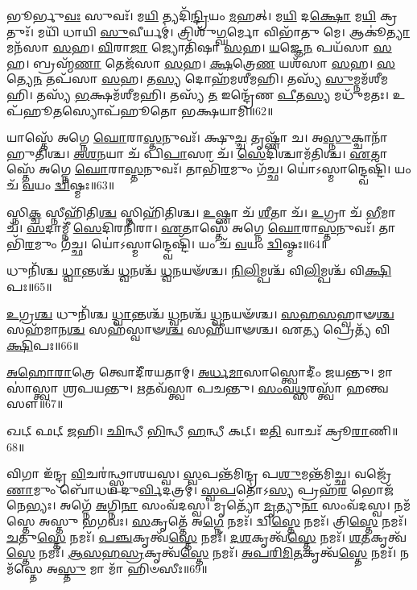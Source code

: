 𑌭𑍂𑌰𑍍𑌭𑍁\-\ul{𑌵𑌃} 𑌸𑍁𑌵𑌃᳴। 
𑌮\-\ul{𑌯𑌿} 𑌤𑍍𑌯𑌦𑌿᳴\-\ul{𑌨𑍍𑌦𑍍𑌰𑌿}\-𑌯𑌂 \ul{𑌮}\-𑌹𑌤𑍍। 
𑌮\-\ul{𑌯𑌿} 𑌦\-\ul{𑌕𑍍𑌷𑍋} 𑌮\-\ul{𑌯𑌿} 𑌕𑍍𑌰𑌤𑍁𑌃᳴। 
𑌮𑌯𑌿᳴ 𑌧𑌾𑌯𑌿 \ul{𑌸𑍁}\-𑌵𑍀𑌰𑍍𑌯𑌮𑍍॑। 
𑌤𑍍𑌰𑌿𑌶𑍁᳴\-\ul{𑌗𑍍𑌘}\-𑌰𑍍𑌮𑍋 𑌵𑌿𑌭𑌾᳴𑌤𑍁 𑌮𑍇। 
𑌆𑌕𑍂॑\-\ul{𑌤𑍍𑌯𑌾} 𑌮𑌨᳴𑌸𑌾 \ul{𑌸}\-𑌹। 
\-\ul{𑌵𑌿}\-𑌰𑌾\-\ul{𑌜𑌾} 𑌜𑍍𑌯𑍋𑌤𑌿᳴𑌷𑌾 \ul{𑌸}\-𑌹। 
\-\ul{𑌯}\-𑌜𑍍𑌞𑍇\-\ul{𑌨} 𑌪𑌯᳴𑌸𑌾 \ul{𑌸}\-𑌹। 
𑌬𑍍𑌰𑌹𑍍𑌮᳴\-\ul{𑌣𑌾} 𑌤𑍇𑌜᳴𑌸𑌾 \ul{𑌸}\-𑌹। 
\-\ul{𑌕𑍍𑌷}\-𑌤𑍍𑌰𑍇\-\ul{𑌣} 𑌯𑌶᳴𑌸𑌾 \ul{𑌸}\-𑌹। 
\-\ul{𑌸}\-𑌤𑍍𑌯𑍇\-\ul{𑌨} 𑌤𑌪᳴𑌸𑌾 \ul{𑌸}\-𑌹। 
𑌤\-\ul{𑌸𑍍𑌯} 𑌦𑍋𑌹᳴𑌮𑌶𑍀𑌮𑌹𑌿। 
𑌤𑌸𑍍𑌯᳴ \ul{𑌸𑍁}\-𑌮𑍍𑌨𑌮᳴𑌶𑍀𑌮𑌹𑌿। 
𑌤𑌸𑍍𑌯᳴ \ul{𑌭}\-𑌕𑍍𑌷𑌮᳴𑌶𑍀𑌮𑌹𑌿। 
𑌤𑌸𑍍𑌯᳴ \ul{𑌤} 𑌇𑌨𑍍𑌦𑍍𑌰𑍇᳴𑌣 \ul{𑌪𑍀}\-𑌤\-\ul{𑌸𑍍𑌯} 𑌮𑌧𑍁᳴𑌮𑌤𑌃। 
𑌉𑌪᳴𑌹𑍂\-\ul{𑌤}\-𑌸𑍍𑌯𑍋𑌪᳴𑌹𑍂𑌤𑍋 𑌭𑌕𑍍𑌷𑌯𑌾𑌮𑌿॥62॥
\anuvakamend[𑌯𑌶᳴𑌸𑌾 \ul{𑌸}\-𑌹 𑌷𑌟𑍍𑌚᳴]

𑌯𑌾𑌸𑍍𑌤𑍇᳴ 𑌅𑌗𑍍𑌨𑍇 \ul{𑌘𑍋}\-𑌰𑌾\-\ul{𑌸𑍍𑌤}\-𑌨𑍁𑌵𑌃᳴। 
𑌕𑍍𑌷𑍁\-\ul{𑌚𑍍𑌚} 𑌤𑍃𑌷𑍍𑌣𑌾᳴ 𑌚। 
𑌅\-\ul{𑌸𑍍𑌨𑍁}\-𑌕𑍍𑌚𑌾𑌨𑌾᳴𑌹𑍁𑌤𑌿𑌶𑍍𑌚। 
\-\ul{𑌅}\-\-\ul{𑌶}\-\-\ul{𑌨}\-𑌯𑌾 𑌚᳴ 𑌪𑌿\-\ul{𑌪𑌾}\-𑌸𑌾 𑌚᳴। 
\-\ul{𑌸𑍇}\-𑌦𑌿𑌶𑍍𑌚𑌾𑌮᳴𑌤𑌿𑌶𑍍𑌚। 
\-\ul{𑌏}\-𑌤𑌾𑌸𑍍𑌤𑍇᳴ 𑌅𑌗𑍍𑌨𑍇 \ul{𑌘𑍋}\-𑌰𑌾\-\ul{𑌸𑍍𑌤}\-𑌨𑍁𑌵𑌃᳴। 
𑌤𑌾𑌭𑌿᳴\-\ul{𑌰}\-𑌮𑍁𑌂 𑌗᳴𑌚𑍍𑌛। 
𑌯𑍋॑𑌽𑌸𑍍𑌮𑌾𑌨𑍍𑌦𑍍𑌵𑍇𑌷𑍍𑌟𑌿᳴। 
𑌯𑌂 𑌚᳴ \ul{𑌵}\-𑌯𑌂 \ul{𑌦𑍍𑌵𑌿}\-𑌷𑍍𑌮𑌃॥63॥
\anuvakamend

𑌸𑍍𑌨𑌿\-\ul{𑌕𑍍𑌚} 𑌸𑍍𑌨𑍀𑌹𑌿᳴𑌤𑌿\-\ul{𑌶𑍍𑌚} 𑌸𑍍𑌨𑌿𑌹𑌿᳴𑌤𑌿𑌶𑍍𑌚। 
\-\ul{𑌉}\-𑌷𑍍𑌣𑌾 𑌚᳴ \ul{𑌶𑍀}\-𑌤𑌾 𑌚᳴। 
\-\ul{𑌉}\-𑌗𑍍𑌰𑌾 𑌚᳴ \ul{𑌭𑍀}\-𑌮𑌾 𑌚᳴। 
\-\ul{𑌸}\-𑌦𑌾𑌮𑍍𑌨𑍀᳴ \ul{𑌸𑍇}\-𑌦𑌿𑌰𑌨𑌿᳴𑌰𑌾। 
\-\ul{𑌏}\-𑌤𑌾𑌸𑍍𑌤𑍇᳴ 𑌅𑌗𑍍𑌨𑍇 \ul{𑌘𑍋}\-𑌰𑌾\-\ul{𑌸𑍍𑌤}\-𑌨𑍁𑌵𑌃᳴। 
𑌤𑌾𑌭𑌿᳴\-\ul{𑌰}\-𑌮𑍁𑌂 𑌗᳴𑌚𑍍𑌛। 
𑌯𑍋॑𑌽𑌸𑍍𑌮𑌾𑌨𑍍𑌦𑍍𑌵𑍇𑌷𑍍𑌟𑌿᳴। 
𑌯𑌂 𑌚᳴ \ul{𑌵}\-𑌯𑌂 \ul{𑌦𑍍𑌵𑌿}\-𑌷𑍍𑌮𑌃॥64॥
\anuvakamend

𑌧𑍁𑌨𑌿᳴𑌶𑍍𑌚 \ul{𑌧𑍍𑌵𑌾}\-𑌨𑍍𑌤𑌶𑍍𑌚᳴ \ul{𑌧𑍍𑌵}\-𑌨𑌶𑍍𑌚᳴ \ul{𑌧𑍍𑌵}\-𑌨𑌯𑍟᳴𑌶𑍍𑌚। 
\-\ul{𑌨𑌿}\-\-\ul{𑌲𑌿}\-𑌮𑍍𑌪𑌶𑍍𑌚᳴ 𑌵𑌿\-\ul{𑌲𑌿}\-𑌮𑍍𑌪𑌶𑍍𑌚᳴ 𑌵𑌿\-\ul{𑌕𑍍𑌷𑌿}\-𑌪𑌃॥65॥
\anuvakamend

\-\ul{𑌉}\-𑌗𑍍𑌰\-\ul{𑌶𑍍𑌚} 𑌧𑍁𑌨𑌿᳴𑌶𑍍𑌚 \ul{𑌧𑍍𑌵𑌾}\-𑌨𑍍𑌤𑌶𑍍𑌚᳴ \ul{𑌧𑍍𑌵}\-𑌨𑌶𑍍𑌚᳴ \ul{𑌧𑍍𑌵}\-𑌨𑌯𑍟᳴𑌶𑍍𑌚। 
\-\ul{𑌸}\-\-\ul{𑌹}\-\-\ul{𑌸}\-𑌹𑍍𑌵𑌾𑍟\-\ul{𑌶𑍍𑌚} 𑌸𑌹᳴𑌮𑌾𑌨\-\ul{𑌶𑍍𑌚} 𑌸𑌹᳴𑌸𑍍𑌵𑌾𑍟\-\ul{𑌶𑍍𑌚} 𑌸𑌹𑍀᳴𑌯𑌾𑍟𑌶𑍍𑌚। 
𑌏\-\ul{𑌤𑍍𑌯} 𑌪𑍍𑌰𑍇𑌤𑍍𑌯᳴ 𑌵𑌿\-\ul{𑌕𑍍𑌷𑌿}\-𑌪𑌃॥66॥
\anuvakamend


\-\ul{𑌅}\-\-\ul{𑌹𑍋}\-\-\ul{𑌰𑌾}\-𑌤𑍍𑌰𑍇 𑌤𑍍𑌵𑍋𑌦𑍀᳴𑌰𑌯𑌤𑌾𑌮𑍍। 
\-\ul{𑌅}\-\-\ul{𑌰𑍍𑌧}\-\-\ul{𑌮𑌾}\-𑌸𑌾𑌸𑍍𑌤𑍍𑌵𑍋𑌦𑍀𑌂॑ 𑌜𑌯𑌨𑍍𑌤𑍁। 
𑌮𑌾𑌸𑌾॑𑌸𑍍𑌤𑍍𑌵𑌾 𑌶𑍍𑌰𑌪𑌯𑌨𑍍𑌤𑍁। 
\-\ul{𑌋}\-𑌤𑌵᳴𑌸𑍍𑌤𑍍𑌵𑌾 𑌪𑌚𑌨𑍍𑌤𑍁। 
\-\ul{𑌸𑌂}\-\-\ul{𑌵}\-\-\ul{𑌥𑍍𑌸}\-𑌰𑌸𑍍𑌤𑍍𑌵𑌾᳴ 𑌹𑌨𑍍𑌤𑍍𑌵𑌸𑍗॥67॥
\anuvakamend

𑌖𑌟𑍍 𑌫𑌟𑍍 \ul{𑌜}\-𑌹𑌿। 
\-\ul{𑌛𑌿}\-𑌨𑍍𑌧𑍀 \ul{𑌭𑌿}\-𑌨𑍍𑌧𑍀 \ul{𑌹}\-𑌨𑍍𑌧𑍀 𑌕𑌟𑍍। 
𑌇\-\ul{𑌤𑌿} 𑌵𑌾𑌚𑌃᳴ 𑌕𑍍𑌰𑍂\-\ul{𑌰𑌾}\-𑌣𑌿॥68॥
\anuvakamend

𑌵𑌿𑌗𑌾 𑌇᳴𑌨𑍍𑌦𑍍𑌰 \ul{𑌵𑌿}\-𑌚𑌰॑𑌨𑍍𑌥𑍍𑌸𑍍𑌪𑌾𑌶𑌯𑌸𑍍𑌵। 
\-\ul{𑌸𑍍𑌵}\-𑌪𑌨𑍍𑌤᳴𑌮𑌿𑌨𑍍𑌦𑍍𑌰 𑌪\-\ul{𑌶𑍁}\-𑌮𑌨𑍍𑌤᳴𑌮𑌿𑌚𑍍𑌛। 
𑌵𑌜𑍍𑌰𑍇᳴\-\ul{𑌣𑌾}\-𑌮𑍁𑌂 𑌬𑍋᳴𑌧𑌯 𑌦𑍁\-\ul{𑌰𑍍𑌵𑌿}\-𑌦𑌤𑍍𑌰𑌮𑍍॑। 
\-\ul{𑌸𑍍𑌵}\-\-\ul{𑌪}\-𑌤𑍋॑𑌽\-\ul{𑌸𑍍𑌯} 𑌪𑍍𑌰𑌹᳴\-\ul{𑌰} 𑌭𑍋𑌜᳴𑌨𑍇𑌭𑍍𑌯𑌃। 
𑌅𑌗𑍍𑌨𑍇᳴ \ul{𑌅}\-𑌗𑍍𑌨𑌿\-\ul{𑌨𑌾} 𑌸𑌂𑌵᳴𑌦𑌸𑍍𑌵। 
𑌮𑍃𑌤𑍍𑌯𑍋᳴ \ul{𑌮𑍃}\-𑌤𑍍𑌯𑍁\-\ul{𑌨𑌾} 𑌸𑌂𑌵᳴𑌦𑌸𑍍𑌵। 
𑌨𑌮᳴𑌸𑍍𑌤𑍇 𑌅𑌸𑍍𑌤𑍁 𑌭𑌗𑌵𑌃। 
\-\ul{𑌸}\-𑌕𑍃𑌤𑍍𑌤𑍇᳴ 𑌅\-\ul{𑌗𑍍𑌨𑍇} 𑌨𑌮𑌃᳴। 
𑌦𑍍𑌵𑌿\-\ul{𑌸𑍍𑌤𑍇} 𑌨𑌮𑌃᳴। 
𑌤𑍍𑌰𑌿\-\ul{𑌸𑍍𑌤𑍇} 𑌨𑌮𑌃᳴। 
\-\ul{𑌚}\-𑌤𑍁\-\ul{𑌸𑍍𑌤𑍇} 𑌨𑌮𑌃᳴। 
\-\ul{𑌪}\-\-\ul{𑌞𑍍𑌚}\-𑌕𑍃𑌤𑍍𑌵᳴\-\ul{𑌸𑍍𑌤𑍇} 𑌨𑌮𑌃᳴। 
\-\ul{𑌦}\-\-\ul{𑌶}\-𑌕𑍃𑌤𑍍𑌵᳴\-\ul{𑌸𑍍𑌤𑍇} 𑌨𑌮𑌃᳴। 
\-\ul{𑌶}\-\-\ul{𑌤}\-𑌕𑍃𑌤𑍍𑌵᳴\-\ul{𑌸𑍍𑌤𑍇} 𑌨𑌮𑌃᳴। 
\-\ul{𑌆}\-\-\ul{𑌸}\-\-\ul{𑌹}\-\-\ul{𑌸𑍍𑌰}\-𑌕𑍃𑌤𑍍𑌵᳴\-\ul{𑌸𑍍𑌤𑍇} 𑌨𑌮𑌃᳴। 
\-\ul{𑌅}\-\-\ul{𑌪}\-\-\ul{𑌰𑌿}\-\-\ul{𑌮𑌿}\-\-\ul{𑌤}\-𑌕𑍃𑌤𑍍𑌵᳴\-\ul{𑌸𑍍𑌤𑍇} 𑌨𑌮𑌃᳴। 
𑌨𑌮᳴𑌸𑍍𑌤𑍇 𑌅\-\ul{𑌸𑍍𑌤𑍁} 𑌮𑌾 𑌮𑌾᳴ 𑌹𑌿𑍞𑌸𑍀𑌃॥69॥
\anuvakamend[𑌤𑍍𑌰𑌿\-\ul{𑌸𑍍𑌤𑍇} 𑌨𑌮𑌃᳴ \ul{𑌸}\-𑌪𑍍𑌤 𑌚᳴]

